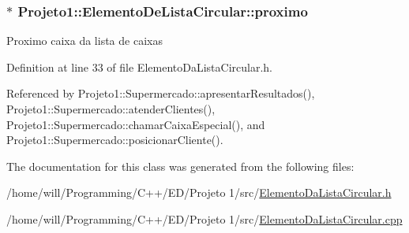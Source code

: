 \hypertarget{classProjeto1_1_1ElementoDeListaCircular_a65b5ca20f12c1436d2ffa96421be919b}{
\subsubsection[{proximo}]{$\ast$ {\bf Projeto1::ElementoDeListaCircular::proximo}}}
\label{classProjeto1_1_1ElementoDeListaCircular_a65b5ca20f12c1436d2ffa96421be919b}
Proximo caixa da lista de caixas 

Definition at line 33 of file ElementoDaListaCircular.h.



Referenced by Projeto1::Supermercado::apresentarResultados(), Projeto1::Supermercado::atenderClientes(), Projeto1::Supermercado::chamarCaixaEspecial(), and Projeto1::Supermercado::posicionarCliente().



The documentation for this class was generated from the following files:\begin{DoxyCompactItemize}
\item 
/home/will/Programming/C++/ED/Projeto 1/src/\hyperlink{ElementoDaListaCircular_8h}{ElementoDaListaCircular.h}\item 
/home/will/Programming/C++/ED/Projeto 1/src/\hyperlink{ElementoDaListaCircular_8cpp}{ElementoDaListaCircular.cpp}\end{DoxyCompactItemize}
